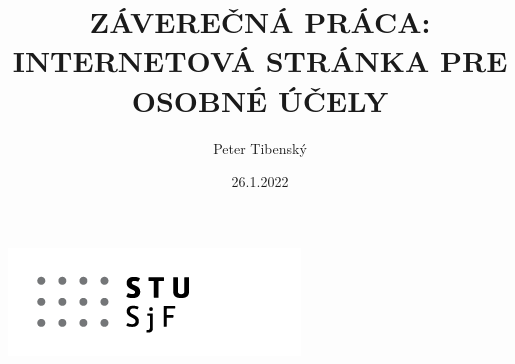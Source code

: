 \documentclass[serif,11pt]{beamer}
\title[{\sc Záverečná práca, DaI } \hspace{0.8cm} \insertframenumber/\inserttotalframenumber]{{\sc ZÁVEREČNÁ PRÁCA: INTERNETOVÁ STRÁNKA PRE OSOBNÉ ÚČELY }}
\author[ZÁVEREČNÁ PRÁCA --- {\sc 24.1.2022}]{{Peter Tibenský}}
\date{26.1.2022}
\institute{SLOVENSKÁ TECHNICKÁ UNIVERZITA V BRATISLAVE STROJNÍCKA FAKULTA}
\begin{document}
\begin{frame}
  \begin{center}
    \vspace{0.1cm}
    \includegraphics[scale=0.5]{STU-SjF-zfv.png}
  \end{center}
  \titlepage
\end{frame}

%


%


%
%
%
%
%
%
%
%
%


\end{document}
